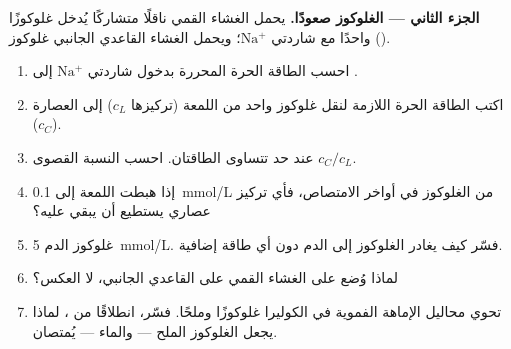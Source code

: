 \begin{problem}
\medskip
\noindent\textbf{الجزء الثاني --- الغلوكوز صعودًا.}
يحمل الغشاء القمي ناقلًا متشاركًا يُدخل غلوكوزًا واحدًا مع شاردتي
$\mathrm{Na^+}$؛ ويحمل الغشاء القاعدي الجانبي  غلوكوز ().
\begin{enumerate}[resume]
  \item احسب الطاقة الحرة المحررة بدخول شاردتي $\mathrm{Na^+}$ إلى
        .
  \item اكتب الطاقة الحرة اللازمة لنقل غلوكوز واحد من اللمعة (تركيزها
        $c_L$) إلى العصارة ($c_C$).
  \item عند حد  تتساوى الطاقتان. احسب النسبة القصوى
        $c_C/c_L$.
  \item إذا هبطت اللمعة إلى \qty{0.1}{mmol/L} من الغلوكوز في أواخر
        الامتصاص، فأي تركيز عصاري يستطيع  أن يبقي
        عليه؟
  \item غلوكوز الدم \qty{5}{mmol/L}. فسّر كيف يغادر الغلوكوز 
        إلى الدم دون أي طاقة إضافية.
  \item لماذا وُضع  على الغشاء القمي  على
        القاعدي الجانبي، لا العكس؟
  \item تحوي محاليل الإماهة الفموية في الكوليرا غلوكوزًا وملحًا. فسّر،
        انطلاقًا من ، لماذا يجعل الغلوكوز الملح ---
        والماء --- يُمتصان.
\end{enumerate}


\end{problem}
